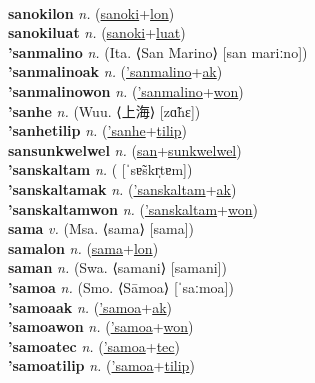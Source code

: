  \label{sanokiles} \\
\textbf{sanokilon} \textit{n.} (\hyperref[sanoki]{sanoki}+\hyperref[lon]{lon})
 \label{sanokilon} \\
\textbf{sanokiluat} \textit{n.} (\hyperref[sanoki]{sanoki}+\hyperref[luat]{luat})
 \label{sanokiluat} \\
\textbf{'sanmalino} \textit{n.} (Ita. ⟨San Marino⟩ [san mariːno])
 \label{'sanmalino} \\
\textbf{'sanmalinoak} \textit{n.} (\hyperref['sanmalino]{'sanmalino}+\hyperref[ak]{ak})
 \label{'sanmalinoak} \\
\textbf{'sanmalinowon} \textit{n.} (\hyperref['sanmalino]{'sanmalino}+\hyperref[won]{won})
 \label{'sanmalinowon} \\
\textbf{'sanhe} \textit{n.} (Wuu. ⟨上海⟩ [zɑ̃hɛ])
 \label{'sanhe} \\
\textbf{'sanhetilip} \textit{n.} (\hyperref['sanhe]{'sanhe}+\hyperref[tilip]{tilip})
 \label{'sanhetilip} \\
\textbf{sansunkwelwel} \textit{n.} (\hyperref[san]{san}+\hyperref[sunkwelwel]{sunkwelwel})
 \label{sansunkwelwel} \\
\textbf{'sanskaltam} \textit{n.} ( [ˈsɐ̃skr̩tɐm])
 \label{'sanskaltam} \\
\textbf{'sanskaltamak} \textit{n.} (\hyperref['sanskaltam]{'sanskaltam}+\hyperref[ak]{ak})
 \label{'sanskaltamak} \\
\textbf{'sanskaltamwon} \textit{n.} (\hyperref['sanskaltam]{'sanskaltam}+\hyperref[won]{won})
 \label{'sanskaltamwon} \\
\textbf{sama} \textit{v.} (Msa. ⟨sama⟩ [sama])
 \label{sama} \\
\textbf{samalon} \textit{n.} (\hyperref[sama]{sama}+\hyperref[lon]{lon})
 \label{samalon} \\
\textbf{saman} \textit{n.} (Swa. ⟨samani⟩ [samani])
 \label{saman} \\
\textbf{'samoa} \textit{n.} (Smo. ⟨Sāmoa⟩ [ˈsaːmoa])
 \label{'samoa} \\
\textbf{'samoaak} \textit{n.} (\hyperref['samoa]{'samoa}+\hyperref[ak]{ak})
 \label{'samoaak} \\
\textbf{'samoawon} \textit{n.} (\hyperref['samoa]{'samoa}+\hyperref[won]{won})
 \label{'samoawon} \\
\textbf{'samoatec} \textit{n.} (\hyperref['samoa]{'samoa}+\hyperref[tec]{tec})
 \label{'samoatec} \\
\textbf{'samoatilip} \textit{n.} (\hyperref['samoa]{'samoa}+\hyperref[tilip]{tilip})
